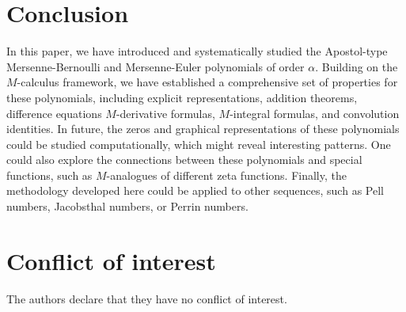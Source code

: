 \documentclass[10pt,a4paper]{amsart}
\numberwithin{equation}{section}
\begin{document}
\section{Conclusion}

In this paper, we have introduced and systematically studied the Apostol-type Mersenne-Bernoulli and Mersenne-Euler polynomials of order $\alpha$. Building on the $M$-calculus framework, we have established a comprehensive set of properties for these polynomials, including explicit representations, addition theorems, difference equations $M$-derivative formulas, $M$-integral formulas, and convolution identities. In future, the zeros and graphical representations of these polynomials could be studied computationally, which might reveal interesting patterns. One could also explore the connections between these polynomials and special functions, such as $M$-analogues of different zeta functions. Finally, the methodology developed here could be applied to other sequences, such as Pell numbers, Jacobsthal numbers, or Perrin numbers.

\section*{Conflict of interest}
The authors declare that they have no conflict of interest.
\end{document}
